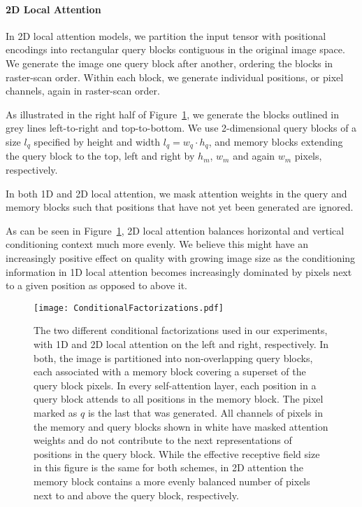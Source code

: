 \documentclass{article}
\begin{document}
\paragraph{2D Local Attention} \label{sec:loc-2d} In 2D local attention models, we partition the input tensor with positional encodings into rectangular query blocks contiguous in the original image space. We generate the image one query block after another, ordering the blocks in raster-scan order. Within each block, we generate individual positions, or pixel channels, again in raster-scan order.

As illustrated in the right half of Figure~\ref{fig:conditional-factorizations}, we generate the blocks outlined in grey lines left-to-right and top-to-bottom. We use 2-dimensional query blocks of a size $l_q$ specified by height and width $l_q = w_q \cdot h_q$, and memory blocks extending the query block to the top, left and right by $h_m$, $w_m$ and again $w_m$ pixels, respectively.

In both 1D and 2D local attention, we mask attention weights in the query and memory blocks such that positions that have not yet been generated are ignored.

As can be seen in Figure~\ref{fig:conditional-factorizations}, 2D local attention balances horizontal and vertical conditioning context much more evenly. We believe this might have an increasingly positive effect on quality with growing image size as the conditioning information in 1D local attention becomes increasingly dominated by pixels next to a given position as opposed to above it. 







\begin{figure}
\texttt{[image: ConditionalFactorizations.pdf]}
  \caption{The two different conditional factorizations used in our experiments, with 1D and 2D local attention on the left and right, respectively. In both, the image is partitioned into non-overlapping query blocks, each associated with a memory block covering a superset of the query block pixels.
  In every self-attention layer, each position in a query block attends to all positions in the memory block.
  The pixel marked as $q$ is the last that was generated. All channels of pixels in the memory and query blocks shown in white have masked attention weights and do not contribute to the next representations of positions in the query block. While the effective receptive field size in this figure is the same for both schemes, in 2D attention the memory block
  contains a more evenly balanced number of pixels next to and above the query block, respectively.}
  \label{fig:conditional-factorizations}
\end{figure}
\end{document}
